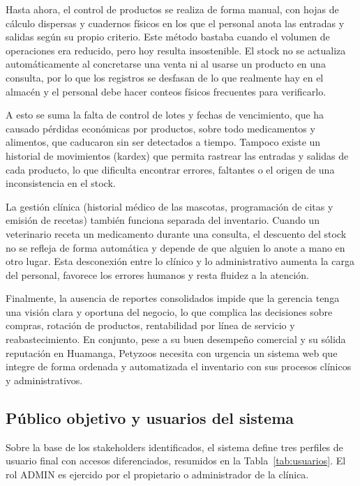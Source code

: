\documentclass[11pt,a4paper]{report}
\begin{document}
Hasta ahora, el control de productos se realiza de forma manual, con hojas de cálculo dispersas y cuadernos físicos en los que el personal anota las entradas y salidas según su propio criterio. Este método bastaba cuando el volumen de operaciones era reducido, pero hoy resulta insostenible. El stock no se actualiza automáticamente al concretarse una venta ni al usarse un producto en una consulta, por lo que los registros se desfasan de lo que realmente hay en el almacén y el personal debe hacer conteos físicos frecuentes para verificarlo.

A esto se suma la falta de control de lotes y fechas de vencimiento, que ha causado pérdidas económicas por productos, sobre todo medicamentos y alimentos, que caducaron sin ser detectados a tiempo. Tampoco existe un historial de movimientos (kardex) que permita rastrear las entradas y salidas de cada producto, lo que dificulta encontrar errores, faltantes o el origen de una inconsistencia en el stock.

La gestión clínica (historial médico de las mascotas, programación de citas y emisión de recetas) también funciona separada del inventario. Cuando un veterinario receta un medicamento durante una consulta, el descuento del stock no se refleja de forma automática y depende de que alguien lo anote a mano en otro lugar. Esta desconexión entre lo clínico y lo administrativo aumenta la carga del personal, favorece los errores humanos y resta fluidez a la atención.

Finalmente, la ausencia de reportes consolidados impide que la gerencia tenga una visión clara y oportuna del negocio, lo que complica las decisiones sobre compras, rotación de productos, rentabilidad por línea de servicio y reabastecimiento. En conjunto, pese a su buen desempeño comercial y su sólida reputación en Huamanga, Petyzoos necesita con urgencia un sistema web que integre de forma ordenada y automatizada el inventario con sus procesos clínicos y administrativos.

\subsection{Público objetivo y usuarios del sistema}
Sobre la base de los stakeholders identificados, el sistema define tres perfiles de usuario final con accesos diferenciados, resumidos en la Tabla~\ref{tab:usuarios}. El rol ADMIN es ejercido por el propietario o administrador de la clínica.
\end{document}
